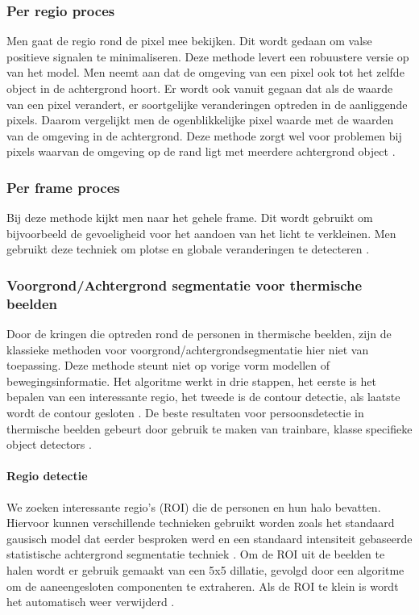 \subsubsection{Per regio proces}
\label{refPRP}
Men gaat de regio rond de pixel mee bekijken. Dit wordt gedaan om valse positieve signalen te minimaliseren. Deze methode levert een robuustere versie op van het model. Men neemt aan dat de omgeving van een pixel ook tot het zelfde object in de achtergrond hoort. Er wordt ook vanuit gegaan dat als de waarde van een pixel verandert, er soortgelijke veranderingen optreden in de aanliggende pixels. Daarom vergelijkt men de ogenblikkelijke pixel waarde met de waarden van de omgeving in de achtergrond. Deze methode zorgt wel voor problemen bij pixels waarvan de omgeving op de rand ligt met meerdere achtergrond object  \cite{bibBET8}.

\subsubsection{Per frame proces}
\label{refPFP}
Bij deze methode kijkt men naar het gehele frame. Dit wordt gebruikt om bijvoorbeeld de gevoeligheid voor het aandoen van het licht te verkleinen. Men gebruikt deze techniek om plotse en globale veranderingen te detecteren \cite{bibBET8}.

\subsubsection{Voorgrond/Achtergrond segmentatie voor thermische beelden}
\label{refBETB}
Door de kringen die optreden rond de personen in thermische beelden, zijn de klassieke methoden voor voorgrond/achtergrondsegmentatie hier niet van toepassing. Deze methode steunt niet op vorige vorm modellen of bewegingsinformatie. Het algoritme werkt in drie stappen, het eerste is het bepalen van een interessante regio, het tweede is de contour detectie, als laatste wordt de contour gesloten \cite{bibBET5}. De beste resultaten voor persoonsdetectie in thermische beelden gebeurt door gebruik te maken van trainbare, klasse specifieke object detectors \cite{bibBET7}.

\paragraph{Regio detectie}
We zoeken interessante regio's (ROI) die de personen en hun halo bevatten. Hiervoor kunnen verschillende technieken gebruikt worden zoals  het standaard gausisch model dat eerder besproken werd en een standaard intensiteit gebaseerde statistische achtergrond segmentatie techniek \cite{bibBET6}. Om de ROI uit de beelden te halen wordt er gebruik gemaakt van een 5x5 dillatie, gevolgd door een algoritme om de aaneengesloten componenten te extraheren. Als de ROI te klein is wordt het automatisch weer verwijderd \cite{bibBET5}.

